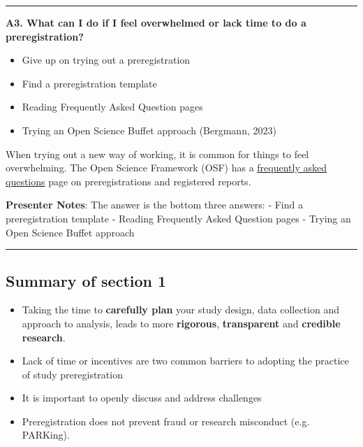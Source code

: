 \documentclass[
  letterpaper,
  DIV=11,
  numbers=noendperiod]{scrartcl}
\providecommand{\tightlist}{%
  \setlength{\itemsep}{0pt}\setlength{\parskip}{0pt}}
\begin{document}
\begin{center}\rule{0.5\linewidth}{0.5pt}\end{center}

\textbf{A3. What can I do if I feel overwhelmed or lack time to do a
preregistration?}

\begin{itemize}
\tightlist
\item[$\square$]
  Give up on trying out a preregistration
\item[$\boxtimes$]
  Find a preregistration template
\item[$\boxtimes$]
  Reading Frequently Asked Question pages
\item[$\boxtimes$]
  Trying an Open Science Buffet approach (Bergmann, 2023)
\end{itemize}

\begin{tcolorbox}[enhanced jigsaw, arc=.35mm, bottomrule=.15mm, bottomtitle=1mm, breakable, colback=white, colbacktitle=quarto-callout-note-color!10!white, colframe=quarto-callout-note-color-frame, coltitle=black, left=2mm, leftrule=.75mm, opacityback=0, opacitybacktitle=0.6, rightrule=.15mm, title=\textcolor{quarto-callout-note-color}{\faInfo}\hspace{0.5em}{Reflecting on answer}, titlerule=0mm, toprule=.15mm, toptitle=1mm]

When trying out a new way of working, it is common for things to feel
overwhelming. The Open Science Framework (OSF) has a
\href{https://help.osf.io/article/330-welcome-to-registrations\#FAQs-GG_d_}{frequently
asked questions} page on preregistrations and registered reports.

\end{tcolorbox}

\textbf{Presenter Notes}: The answer is the bottom three answers: - Find
a preregistration template - Reading Frequently Asked Question pages -
Trying an Open Science Buffet approach

\begin{center}\rule{0.5\linewidth}{0.5pt}\end{center}

\subsection{Summary of section 1}\label{summary-of-section-1}

\begin{itemize}
\tightlist
\item
  Taking the time to \textbf{carefully plan} your study design, data
  collection and approach to analysis, leads to more \textbf{rigorous},
  \textbf{transparent} and \textbf{credible research}.\\
\item
  Lack of time or incentives are two common barriers to adopting the
  practice of study preregistration
\item
  It is important to openly discuss and address challenges
\item
  Preregistration does not prevent fraud or research misconduct (e.g.
  PARKing).
\end{itemize}
\end{document}
